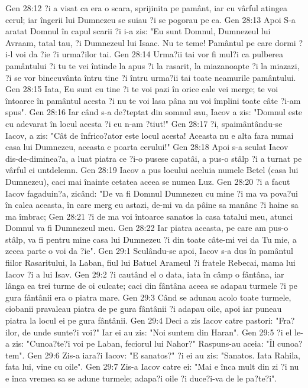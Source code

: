 Gen 28:12  ?i a visat ca era o scara, sprijinita pe pamânt, iar cu vârful atingea cerul; iar îngerii lui Dumnezeu se suiau ?i se pogorau pe ea.
Gen 28:13  Apoi S-a aratat Domnul în capul scarii ?i i-a zis: "Eu sunt Domnul, Dumnezeul lui Avraam, tatal tau, ?i Dumnezeul lui Isaac. Nu te teme! Pamântul pe care dormi ?i-l voi da ?ie ?i urma?ilor tai.
Gen 28:14  Urma?ii tai vor fi mul?i ca pulberea pamântului ?i tu te vei întinde la apus ?i la rasarit, la miazanoapte ?i la miazazi, ?i se vor binecuvânta întru tine ?i întru urma?ii tai toate neamurile pamântului.
Gen 28:15  Iata, Eu sunt cu tine ?i te voi pazi în orice cale vei merge; te voi întoarce în pamântul acesta ?i nu te voi lasa pâna nu voi împlini toate câte ?i-am spus".
Gen 28:16  Iar când s-a de?teptat din somnul sau, Iacov a zis: "Domnul este cu adevarat în locul acesta ?i eu n-am ?tiut!"
Gen 28:17  ?i, spaimântându-se Iacov, a zis: "Cât de înfrico?ator este locul acesta! Aceasta nu e alta fara numai casa lui Dumnezeu, aceasta e poarta cerului!"
Gen 28:18  Apoi s-a sculat Iacov dis-de-diminea?a, a luat piatra ce ?i-o pusese capatâi, a pus-o stâlp ?i a turnat pe vârful ei untdelemn.
Gen 28:19  Iacov a pus locului aceluia numele Betel (casa lui Dumnezeu), caci mai înainte cetatea aceea se numea Luz.
Gen 28:20  ?i a facut Iacov fagaduin?a, zicând: "De va fi Domnul Dumnezeu cu mine ?i ma va pova?ui în calea aceasta, în care merg eu astazi, de-mi va da pâine sa manânc ?i haine sa ma îmbrac;
Gen 28:21  ?i de ma voi întoarce sanatos la casa tatalui meu, atunci Domnul va fi Dumnezeul meu.
Gen 28:22  Iar piatra aceasta, pe care am pus-o stâlp, va fi pentru mine casa lui Dumnezeu ?i din toate câte-mi vei da Tu mie, a zecea parte o voi da ?ie".
Gen 29:1  Sculându-se apoi, Iacov s-a dus în pamântul fiilor Rasaritului, la Laban, fiul lui Batuel Arameul ?i fratele Rebecai, mama lui Iacov ?i a lui Isav.
Gen 29:2  ?i cautând el o data, iata în câmp o fântâna, iar lânga ea trei turme de oi culcate; caci din fântâna aceea se adapau turmele ?i pe gura fântânii era o piatra mare.
Gen 29:3  Când se adunau acolo toate turmele, ciobanii pravaleau piatra de pe gura fântânii ?i adapau oile, apoi iar puneau piatra la locul ei pe gura fântânii.
Gen 29:4  Deci a zis Iacov catre pastori: "Fra?ilor, de unde sunte?i voi?" Iar ei au zis: "Noi suntem din Haran".
Gen 29:5  ?i el le-a zis: "Cunoa?te?i voi pe Laban, feciorul lui Nahor?" Raspuns-au aceia: "Îl cunoa?tem".
Gen 29:6  Zis-a iara?i Iacov: "E sanatos?" ?i ei au zis: "Sanatos. Iata Rahila, fata lui, vine cu oile".
Gen 29:7  Zis-a Iacov catre ei: "Mai e înca mult din zi ?i nu e înca vremea sa se adune turmele; adapa?i oile ?i duce?i-va de le pa?te?i".
